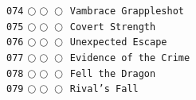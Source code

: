 \documentclass[a4paper,landscape]{article}
\begin{document}
\begin{multicols*}{5}
\texttt{074} \(\bigcirc\!\bigcirc\!\bigcirc\)  \texttt{Vambrace Grappleshot} \vspace{-0.3mm}\\ 
\texttt{075} \(\bigcirc\!\bigcirc\!\bigcirc\)  \texttt{Covert Strength} \vspace{-0.3mm}\\ 
\texttt{076} \(\bigcirc\!\bigcirc\!\bigcirc\)  \texttt{Unexpected Escape} \vspace{-0.3mm}\\ 
\texttt{077} \(\bigcirc\!\bigcirc\!\bigcirc\)  \texttt{Evidence of the Crime} \vspace{-0.3mm}\\ 
\texttt{078} \(\bigcirc\!\bigcirc\!\bigcirc\)  \texttt{Fell the Dragon} \vspace{-0.3mm}\\ 
\texttt{079} \(\bigcirc\!\bigcirc\!\bigcirc\)  \texttt{Rival’s Fall} \vspace{-0.3mm}\\ 

\end{multicols*}
\end{document}
